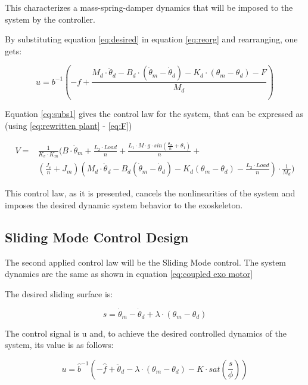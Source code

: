 This characterizes a mass-spring-damper dynamics that will be imposed to the system by the controller.

By substituting equation \ref{eq:desired} in equation \ref{eq:reorg} and rearranging, one gets:

\begin{equation}
\label{eq:subs1}
u = b^{-1} \left(-f+ \frac{M_d \cdot \ddot{\theta}_d-B_d \cdot (\dot{\theta}_m-\dot{\theta}_d)-K_d \cdot (\theta_m-\theta_d)-F}{M_d}\right)
\end{equation}

Equation \ref{eq:subs1} gives the control law for the system, that can be expressed as (using \ref{eq:rewritten plant} - \ref{eq:F})

\begin{equation}
\begin{split}
\label{eq:inpedance law}
V = {} & \frac{1}{K_v \cdot K_m} (B \cdot \dot{\theta}_m + \frac{L_2 \cdot Load}{n} + \frac{L_1 \cdot M \cdot g \cdot sin(\frac{\theta_m}{n}+\theta_1)}{n} + \\ 
& (\frac{J_e}{n}+J_m)(M_d \cdot \ddot{\theta}_d - B_d(\dot{\theta}_m-\dot{\theta}_d)-K_d(\theta_m-\theta_d)-\frac{L_2 \cdot Load}{n})\cdot \frac{1}{M_d})
\end{split}
\end{equation}

This control law, as it is presented, cancels the nonlinearities of the system and imposes the desired dynamic  system behavior to the exoskeleton.

\subsection{Sliding Mode Control Design}

The second applied control law will be the Sliding Mode control. The system dynamics are the same as shown in equation \ref{eq:coupled exo motor}

The desired sliding surface is:

\begin{equation}
\label{eq:SM}
s = \dot{\theta}_m - \dot{\theta}_{d} + \lambda \cdot (\theta_m-\theta_{d})
\end{equation}

The control signal is u and, to achieve the desired controlled dynamics of the system, its value is as follows:

\begin{equation}
\label{eq:uSM}
u = \hat{b}^{-1}\left(-\hat{f}+\ddot{\theta}_{d} -\lambda \cdot (\theta_m-\theta_{d})-K\cdot sat\left(\frac{s}{\phi}\right)\right)
\end{equation}

